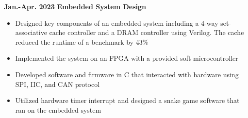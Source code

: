 \documentclass[11pt,a4paper,sans]{moderncv}
\begin{document}
\cventry
{\textnormal{\textbf{Jan.-Apr. 2023}}}
{\textnormal{\textbf{Embedded System Design}}}
{}{}{}
{
    \begin{itemize}
    \item Designed key components of an embedded system including a 4-way set-associative cache controller and a DRAM controller using Verilog. The cache reduced the runtime of a benchmark by 43\%
    \item Implemented the system on an FPGA with a provided soft microcontroller 
    \item Developed software and firmware in C that interacted with hardware using SPI, IIC, and CAN protocol 
    \item Utilized hardware timer interrupt and designed a snake game software that ran on the embedded system
\end{itemize}
}

\end{document}

